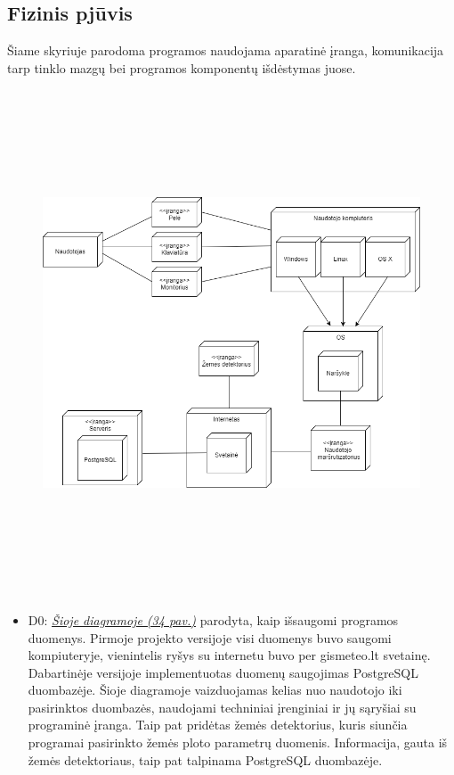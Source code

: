 \documentclass[oneside]{VUMIFPSkursinis}
\begin{document}
\subsection{Fizinis pjūvis}
	Šiame skyriuje parodoma programos naudojama aparatinė įranga, komunikacija tarp tinklo mazgų bei programos komponentų išdėstymas juose.
	\newline
	\vskip 0.5cm
	\begin{figure}[H]
	\centering	
	\includegraphics[width=15cm,height=15cm,keepaspectratio]{2D0.png}
	\caption{}
	\label{fig:Deployment}
\end{figure}
	\begin{itemize}
		\item D0: \hyperref[fig:Deployment]{\textit{Šioje diagramoje (34 pav.)}} parodyta, kaip išsaugomi programos duomenys. 
		Pirmoje projekto versijoje visi duomenys buvo saugomi kompiuteryje, vienintelis ryšys su internetu buvo per gismeteo.lt svetainę. Dabartinėje versijoje implementuotas duomenų saugojimas PostgreSQL duombazėje. Šioje diagramoje vaizduojamas kelias nuo naudotojo iki pasirinktos duombazės, naudojami techniniai įrenginiai ir jų sąryšiai su programinė įranga. Taip pat pridėtas žemės detektorius, kuris siunčia programai pasirinkto žemės ploto parametrų duomenis. Informacija, gauta iš žemės detektoriaus, taip pat talpinama PostgreSQL duombazėje.
	\end{itemize}
\end{document}
